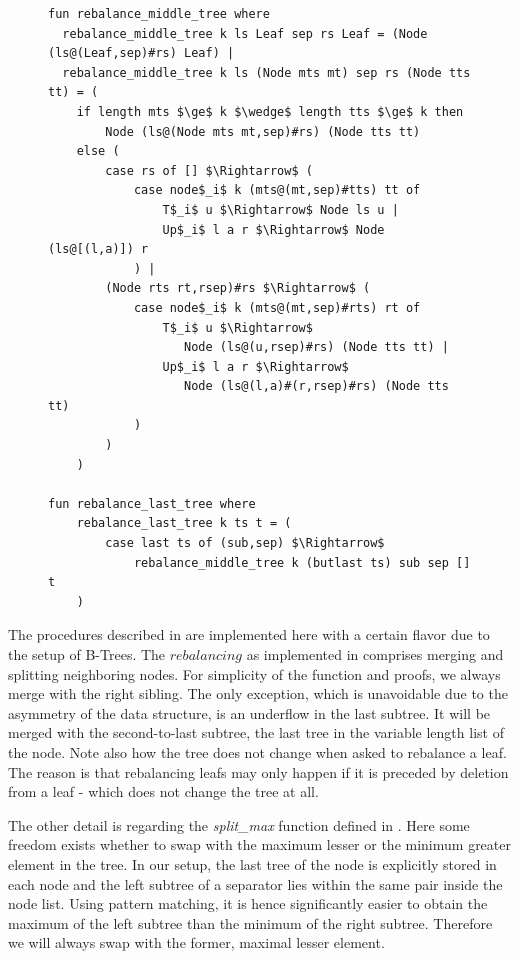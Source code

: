 \begin{figure}
\begin{lstlisting}[mathescape=true, language=Isabelle,label={lst:rebalance-def},
    caption={The rebalancing functions}]
fun rebalance_middle_tree where
  rebalance_middle_tree k ls Leaf sep rs Leaf = (Node (ls@(Leaf,sep)#rs) Leaf) |
  rebalance_middle_tree k ls (Node mts mt) sep rs (Node tts tt) = (
    if length mts $\ge$ k $\wedge$ length tts $\ge$ k then
        Node (ls@(Node mts mt,sep)#rs) (Node tts tt)
    else (
        case rs of [] $\Rightarrow$ (
            case node$_i$ k (mts@(mt,sep)#tts) tt of
                T$_i$ u $\Rightarrow$ Node ls u |
                Up$_i$ l a r $\Rightarrow$ Node (ls@[(l,a)]) r
            ) |
        (Node rts rt,rsep)#rs $\Rightarrow$ (
            case node$_i$ k (mts@(mt,sep)#rts) rt of
                T$_i$ u $\Rightarrow$
                   Node (ls@(u,rsep)#rs) (Node tts tt) |
                Up$_i$ l a r $\Rightarrow$
                   Node (ls@(l,a)#(r,rsep)#rs) (Node tts tt)
            )
        )
    )

fun rebalance_last_tree where
    rebalance_last_tree k ts t = (
        case last ts of (sub,sep) $\Rightarrow$
            rebalance_middle_tree k (butlast ts) sub sep [] t
    )
\end{lstlisting}
\end{figure}

The procedures described in 
are implemented here with a
certain flavor due to the setup of B-Trees.
The $rebalancing$ as implemented in 
comprises merging and splitting neighboring nodes.
For simplicity of the function and proofs, we always
merge with the right sibling.
The only exception, which is unavoidable due to the asymmetry of the data structure,
is an underflow in the last subtree.
It will be merged with the second-to-last subtree, the last
tree in the variable length list of the node.
Note also how the tree does not change when asked to rebalance a leaf.
The reason is that rebalancing leafs may only happen if it is preceded
by deletion from a leaf - which does not change the tree at all.

The other detail is regarding the \textit{split\_max} function
defined in .
Here some freedom exists whether to swap with the maximum lesser
or the minimum greater element in the tree.
In our setup, the last tree of the node is explicitly stored in each node
and the left subtree of a separator lies within the same
pair inside the node list.
Using pattern matching, it is hence significantly
easier to obtain the maximum of the left subtree
than the minimum of the right subtree.
Therefore we will always swap with the former, maximal lesser element.

